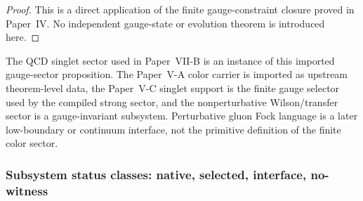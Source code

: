 \documentclass[12pt,a4paper]{article}
\begin{document}
\begin{proof}
This is a direct application of the finite gauge-constraint closure proved in
Paper~IV.  No independent gauge-state or evolution theorem is introduced here.
\end{proof}

\begin{remark}
\label{p12:rem:qcd-singlet-sector}
The QCD singlet sector used in Paper~VII-B is an instance of this imported gauge-sector proposition.  The Paper~V-A color carrier is imported as upstream theorem-level data, the Paper~V-C singlet support is the finite gauge selector used by the compiled strong sector, and the nonperturbative Wilson/transfer sector is a gauge-invariant subsystem.  Perturbative gluon Fock language is a later low-boundary or continuum interface, not the primitive definition of the finite color sector.
\end{remark}


\subsubsection{Subsystem status classes: native, selected, interface, no-witness}
\end{document}
